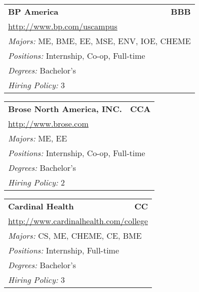 \documentclass[twoside]{article}
\begin{document}
\begin{center}
\begin{multicols}{3}
\begin{FlushLeft}
\begin{minipage}{.9\columnwidth}\begin{tabularx}{.95\columnwidth}{Xr}
                 {\Large\bf BP America} & {\Large\bf BBB}\\
    \multicolumn{2}{p{.95\columnwidth}}{\url{http://www.bp.com/uscampus}}\\
    \multicolumn{2}{p{.95\columnwidth}}{\emph{Majors:} ME, BME, EE, MSE, ENV, IOE, CHEME}\\
    \multicolumn{2}{p{.95\columnwidth}}{\emph{Positions:} Internship, Co-op, Full-time}\\
    \multicolumn{2}{p{.95\columnwidth}}{\emph{Degrees:} Bachelor's}\\
    \multicolumn{2}{p{.95\columnwidth}}{\emph{Hiring Policy:} 3}\\
    \end{tabularx}
    
\end{minipage}
 
\begin{minipage}{.9\columnwidth}\begin{tabularx}{.95\columnwidth}{Xr}
                 {\Large\bf Brose North America, INC.} & {\Large\bf CCA}\\
    \multicolumn{2}{p{.95\columnwidth}}{\url{http://www.brose.com}}\\
    \multicolumn{2}{p{.95\columnwidth}}{\emph{Majors:} ME, EE}\\
    \multicolumn{2}{p{.95\columnwidth}}{\emph{Positions:} Internship, Co-op, Full-time}\\
    \multicolumn{2}{p{.95\columnwidth}}{\emph{Degrees:} Bachelor's}\\
    \multicolumn{2}{p{.95\columnwidth}}{\emph{Hiring Policy:} 2}\\
    \end{tabularx}
    
\end{minipage}
 
\begin{minipage}{.9\columnwidth}\begin{tabularx}{.95\columnwidth}{Xr}
                 {\Large\bf Cardinal Health} & {\Large\bf CC}\\
    \multicolumn{2}{p{.95\columnwidth}}{\url{http://www.cardinalhealth.com/college}}\\
    \multicolumn{2}{p{.95\columnwidth}}{\emph{Majors:} CS, ME, CHEME, CE, BME}\\
    \multicolumn{2}{p{.95\columnwidth}}{\emph{Positions:} Internship, Full-time}\\
    \multicolumn{2}{p{.95\columnwidth}}{\emph{Degrees:} Bachelor's}\\
    \multicolumn{2}{p{.95\columnwidth}}{\emph{Hiring Policy:} 3}\\
    \end{tabularx}
    

\end{minipage}
\end{FlushLeft}
\end{multicols}
\end{center}
\end{document}
